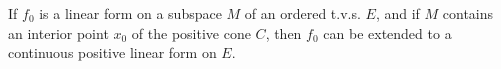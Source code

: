 If $f_0$ is a linear form on a subspace $M$ of an ordered t.v.s. $E$, and if $M$ contains an interior point $x_0$ of the positive cone $C$, then $f_0$ can be extended to a continuous positive linear form on $E$.
